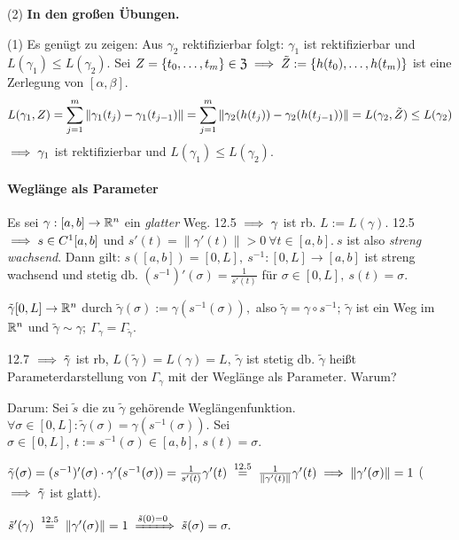 \documentclass[a4paper,oneside,DIV15,BCOR12mm,chapterprefix=true,headings=onelinechapter]{scrbook}
\begin{document}
\begin{beweise}
\item[(2)] \textbf{\color{red}In den großen Übungen.}
\item[(1)] Es genügt zu zeigen: Aus $\gamma_2$ rektifizierbar folgt: $\gamma_1$ ist rektifizierbar und $L(\gamma_1)\le L(\gamma_2)$. Sei $Z=\{t_0,\ldots,t_m\}\in\mathfrak{Z}\implies\tilde{Z}:=\{h(t_0),\ldots, h(t_m)\}$ ist eine Zerlegung von $[\alpha,\beta]$.
$$L(\gamma_1, Z)=\displaystyle\sum_{j=1}^m\|\gamma_1(t_j)-\gamma_1(t_{j-1})\|=\displaystyle\sum_{j=1}^m\|\gamma_2(h(t_j))-\gamma_2(h(t_{j-1}))\|=L(\gamma_2, \tilde{Z})\le L(\gamma_2)$$
$\implies \gamma_1$ ist rektifizierbar und $L(\gamma_1)\le L(\gamma_2)$.
\end{beweise}

\paragraph{Weglänge als Parameter}
Es sei $\gamma:[a,b]\to\mathbb{R}^n$ ein \emph{glatter} Weg. 12.5 $\implies \gamma$ ist rb. $L:=L(\gamma)$. 12.5 $\implies s \in C^1[a,b]$ und $s'(t) = \|\gamma'(t)\| > 0\ \forall t\in[a,b].\ s$ ist also \emph{streng wachsend}. Dann gilt: $s([a,b]) = [0,L],\ s^{-1}:[0,L]\to[a,b]$ ist streng wachsend und stetig db. $(s^{-1})'(\sigma) = \frac{1}{s'(t)}$ für $\sigma \in [0,L],\ s(t) = \sigma.$

\begin{definition}
$\tilde{\gamma}[0,L] \to \mathbb{R}^n$ durch $\tilde{\gamma}(\sigma) := \gamma(s^{-1}(\sigma)),$ also $\tilde{\gamma} = \gamma\circ s^{-1};\ \tilde{\gamma}$ ist ein Weg im $\mathbb{R}^n$ und $\tilde{\gamma} \sim \gamma;\ \Gamma_\gamma = \Gamma_{\tilde{\gamma}}.$

12.7 $\implies \tilde{\gamma}$ ist rb, $L(\tilde{\gamma})=L(\gamma)=L,\ \tilde{\gamma}$ ist stetig db. $\tilde{\gamma}$ heißt Parameterdarstellung von $\Gamma_\gamma$ mit der Weglänge als Parameter. Warum?
\end{definition}

Darum: Sei $\tilde{s}$ die zu $\tilde{\gamma}$ gehörende Weglängenfunktion. $\forall \sigma\in[0,L]: \tilde{\gamma}(\sigma) = \gamma(s^{-1}(\sigma)).$ Sei $\sigma\in[0,L],\ t:= s^{-1}(\sigma) \in [a,b],\ s(t) = \sigma.$

$\tilde{\gamma}(\sigma) = (s^{-1})'(\sigma)\cdot\gamma'(s^{-1}(\sigma)) = \frac{1}{s'(t)}\gamma'(t) \gleichnach{12.5} \frac{1}{\|\gamma'(t)\|}\gamma'(t) \folgt \|\gamma'(\sigma)\|=1$ ($\implies \tilde{\gamma}$ ist glatt).

$\tilde{s}'(\gamma) \gleichnach{12.5} \|\gamma'(\sigma)\| = 1 \folgtwegen{\tilde{s}(0)=0} \tilde{s}(\sigma)=\sigma.$
\end{document}
